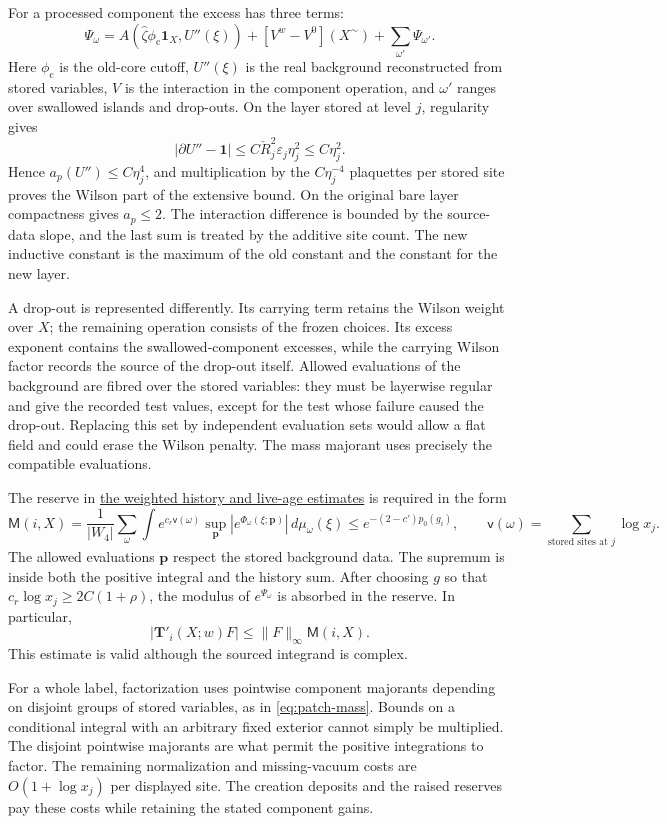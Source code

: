 \documentclass[11pt,letterpaper,reqno]{amsart}
\theoremstyle{definition}
\theoremstyle{remark}
\begin{document}
For a processed component the excess has three terms:
\[
 \Psi_\omega
  =A(\hat\zeta\phi_{\mathrm c}\mathbf1_X,U''(\xi))
       +[V^w-V^0](X^\sim)+\sum_{\omega'}\Psi_{\omega'}.
\]
Here $\phi_{\mathrm c}$ is the old-core cutoff, $U''(\xi)$ is the
real background reconstructed from stored variables, $V$ is the
interaction in the component operation, and $\omega'$ ranges over
swallowed islands and drop-outs. On the layer stored at level $j$,
regularity gives
\[
 |\partial U''-\mathbf1|
      \le C\check R_j^2\varepsilon_j\eta_j^2\le C\eta_j^2.
\]
Hence $a_p(U'')\le C\eta_j^4$, and multiplication by the
$C\eta_j^{-4}$ plaquettes per stored site proves the Wilson part of
the extensive bound. On the original bare layer compactness gives
$a_p\le2$. The interaction difference is bounded by the source-data
slope, and the last sum is treated by the additive site count. The
new inductive constant is the maximum of the old constant and the
constant for the new layer.

A drop-out is represented differently. Its carrying term retains the
Wilson weight over $X$; the remaining operation consists of the frozen
choices. Its excess exponent contains the swallowed-component excesses,
while the carrying Wilson factor records the source of the drop-out
itself. Allowed evaluations of the background are fibred over the
stored variables: they must be layerwise regular and give the recorded
test values, except for the test whose failure caused the drop-out.
Replacing this set by independent evaluation sets would allow a flat
field and could erase the Wilson penalty. The mass majorant uses
precisely the compatible evaluations.

The reserve in \hyperref[hyp:history-bounds]{the weighted history and live-age estimates} is required in the form
\[
 \mathsf M(i,X)=\frac1{|W_4|}\sum_\omega
       \int e^{c_r\mathsf v(\omega)}
          \sup_{\mathbf p}|e^{\Phi_\omega(\xi;\mathbf p)}|
                                 \,d\mu_\omega(\xi)
       \le e^{-(2-c')p_0(g_i)},
 \qquad
 \mathsf v(\omega)=\sum_{\text{stored sites at }j}\log x_j.
\]
The allowed evaluations $\mathbf p$ respect the stored background data.
The supremum is inside both the positive integral and the history sum.
After choosing $g$ so that $c_r\log x_j\ge2C(1+\rho)$, the modulus of
$e^{\Psi_\omega}$ is absorbed in the reserve. In particular,
\[
 |\mathbf T'_i(X;w)F|\le\|F\|_\infty\mathsf M(i,X).
\]
This estimate is valid although the sourced integrand is complex.

For a whole label, factorization uses pointwise component majorants
depending on disjoint groups of stored variables, as in
\eqref{eq:patch-mass}. Bounds on a conditional integral with an arbitrary
fixed exterior cannot simply be multiplied. The disjoint pointwise
majorants are what permit the positive integrations to factor. The
remaining normalization and missing-vacuum costs are
$O(1+\log x_j)$ per displayed site. The creation deposits and the raised
reserves pay these costs while retaining the stated component gains.
\end{document}
